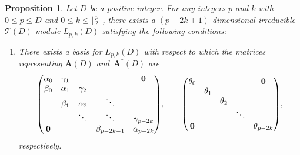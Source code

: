 \documentclass[pdftex]{sigma}%
\def\A{\mathbf A}
\def\T{\mathcal T}
\numberwithin{equation}{section}
\newtheorem{Proposition}[Theorem]{Proposition}
 { \theoremstyle{definition}
\newtheorem{Definition}[Theorem]{Definition}
\newtheorem{Note}[Theorem]{Note}
\newtheorem{Example}[Theorem]{Example}
\newtheorem{Remark}[Theorem]{Remark} }
\begin{document}
\begin{Proposition}\label{prop:Kpk}
Let $D$ be a positive integer.
For any integers $p$ and $k$ with $0\leq p\leq D$ and $0\leq k\leq \big\lfloor \frac{p}{2}\big\rfloor$, there exists a $(p-2k+1)$-dimensional irreducible $\T(D)$-module $L_{p,k}(D)$ satisfying the following conditions:
\begin{enumerate}\itemsep=0pt
\item[$(i)$] There exists a basis for $L_{p,k}(D)$ with respect to which the matrices representing $\A(D)$ and~$\A^*(D)$ are
\begin{gather*}
\begin{pmatrix}
\alpha_0 &\gamma_1 & & &{\bf 0}
\\
\beta_0 &\alpha_1 &\gamma_2
\\
&\beta_1 &\alpha_2 &\ddots
 \\
& &\ddots &\ddots &\gamma_{p-2k}
 \\
{\bf 0} & & &\beta_{p-2k-1} &\alpha_{p-2k}
\end{pmatrix}\!,
\qquad
\begin{pmatrix}
\theta_0 & & & &{\bf 0}
\\
 &\theta_1
\\
 & &\theta_2
 \\
 & & &\ddots
 \\
{\bf 0} & & & &\theta_{p-2k}
\end{pmatrix}\!,
\end{gather*}
respectively.


\end{enumerate}
\end{Proposition}
\end{document}
